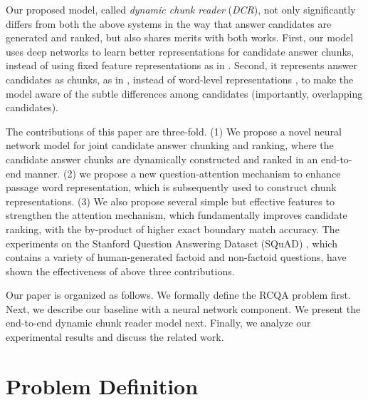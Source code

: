 \documentclass[letterpaper]{article}
\begin{document}
Our proposed model, called {\it dynamic chunk reader} ({\it DCR}), not only significantly differs from both the above systems in the way that answer candidates are generated and ranked, but also shares merits with both works.
First, our model uses deep networks to learn better representations for candidate answer chunks, instead of using fixed feature representations as in \cite{rajpurkar2016squad}.
Second, it represents answer candidates as chunks, as in \cite{rajpurkar2016squad}, instead of word-level representations \cite{wang2016machine}, to make the model aware of the subtle differences among candidates (importantly, overlapping candidates). 




The contributions of this paper are three-fold. (1) We propose a novel neural network model for joint candidate answer chunking and ranking, where the candidate answer chunks are dynamically constructed and ranked in an end-to-end manner. (2) we propose a new question-attention mechanism to enhance passage word representation, which is subsequently used to construct chunk representations. (3) We also propose several simple but effective features to strengthen the attention mechanism, which fundamentally improves candidate ranking, with the by-product of higher exact boundary match accuracy. 
The experiments on the Stanford Question Answering Dataset (SQuAD) \cite{rajpurkar2016squad}, which contains a variety of human-generated factoid and non-factoid questions, have shown the effectiveness of above three contributions.


Our paper is organized as follows. We formally define the RCQA problem first. Next, we describe our baseline with a neural network component. We present the end-to-end dynamic chunk reader model next. Finally, we analyze our experimental results and discuss the related work.














\section{Problem Definition}
\label{sec:definition}
\end{document}
